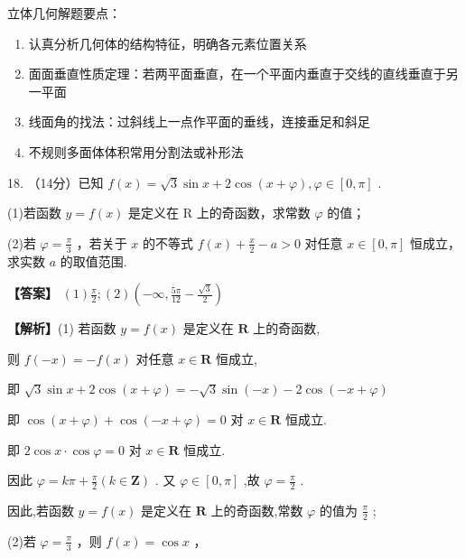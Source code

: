 \documentclass[10pt]{article}
\begin{document}
\begin{tipbox}[教学提示]
立体几何解题要点：
\begin{enumerate}
\item 认真分析几何体的结构特征，明确各元素位置关系
\item 面面垂直性质定理：若两平面垂直，在一个平面内垂直于交线的直线垂直于另一平面
\item 线面角的找法：过斜线上一点作平面的垂线，连接垂足和斜足
\item 不规则多面体体积常用分割法或补形法
\end{enumerate}
\end{tipbox}

\newpage

18. （14分）已知 \(f\left( x\right)  = \sqrt{3}\sin x + 2\cos \left( {x + \varphi }\right) ,\varphi  \in  \left\lbrack  {0,\pi }\right\rbrack\) .

(1)若函数 \(y = f\left( x\right)\) 是定义在 \(\mathrm{R}\) 上的奇函数，求常数 \(\varphi\) 的值；

(2)若 \(\varphi  = \frac{\pi }{3}\) ，若关于 \(x\) 的不等式 \(f\left( x\right)  + \frac{x}{2} - a > 0\) 对任意 \(x \in  \left\lbrack  {0,\pi }\right\rbrack\) 恒成立，求实数 \(a\) 的取值范围.

\textbf{【答案】} \(\left( 1\right) \frac{\pi }{2};\left( 2\right) \left( {-\infty ,\frac{5\pi }{12} - \frac{\sqrt{3}}{2}}\right)\)

\textbf{【解析】}(1) 若函数 \(y = f\left( x\right)\) 是定义在 \(\mathbf{R}\) 上的奇函数,

则 \(f\left( {-x}\right)  =  - f\left( x\right)\) 对任意 \(x \in  \mathbf{R}\) 恒成立,

即 \(\sqrt{3}\sin x + 2\cos \left( {x + \varphi }\right)  =  - \sqrt{3}\sin \left( {-x}\right)  - 2\cos \left( {-x + \varphi }\right)\)

即 \(\cos \left( {x + \varphi }\right)  + \cos \left( {-x + \varphi }\right)  = 0\) 对 \(x \in  \mathbf{R}\) 恒成立.

即 \(2\cos x \cdot  \cos \varphi  = 0\) 对 \(x \in  \mathbf{R}\) 恒成立.

因此 \(\varphi  = {k\pi } + \frac{\pi }{2}\left( {k \in  \mathbf{Z}}\right)\) . 又 \(\varphi  \in  \left\lbrack  {0,\pi }\right\rbrack\) ,故 \(\varphi  = \frac{\pi }{2}\) .

因此,若函数 \(y = f\left( x\right)\) 是定义在 \(\mathbf{R}\) 上的奇函数,常数 \(\varphi\) 的值为 \(\frac{\pi }{2}\) ;

(2)若 \(\varphi  = \frac{\pi }{3}\) ，则 \(f\left( x\right)  = \cos x\) ，
\end{document}
